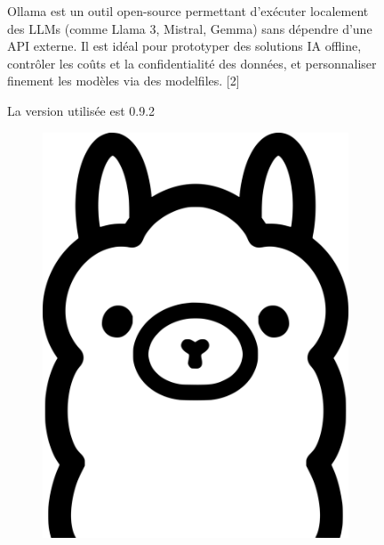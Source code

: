 \documentclass[12pt,a4paper]{report}
\begin{document}
	\begin{figure}[H]
		\begin{minipage}{0.8\textwidth}
			Ollama est un outil open-source permettant d’exécuter localement des LLMs (comme Llama 3, Mistral, Gemma) sans dépendre d’une API externe. Il est idéal pour prototyper des solutions IA offline, contrôler les coûts et la confidentialité des données, et personnaliser finement les modèles via des modelfiles. [2]
			
			La version utilisée est 0.9.2
		\end{minipage}
		\hfill
		\begin{minipage}{0.15\textwidth} 
			\begin{figure}[H]
				\centering
				\includegraphics[width=\linewidth]{ollama-logo.png}
				\label{fig:ollama-logo}
			\end{figure}
		\end{minipage}
	\end{figure}
	
\end{document}
